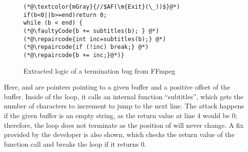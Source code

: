 \documentclass[acmsmall,screen,review,anonymous,nonacm]{acmart}
\begin{document}
\begin{wrapfigure}{R}{0.48\linewidth}
\begin{lstlisting}[xleftmargin=0.5em,name=FFmpeg,numbersep=6pt,basicstyle=\footnotesize\ttfamily]
(*@\textcolor{mGray}{//$AF(\m{Exit}(\_))$}@*)
if(b<0||b>=end)return 0;
while (b < end) {
(*@\faultyCode{b += subtitles(b); } @*)
(*@\repaircode{int inc=subtitles(b);} @*) 
(*@\repaircode{if (!inc) break;} @*) 
(*@\repaircode{b += inc;}@*)}
\end{lstlisting}
\begin{comment}
\begin{minipage}[b]{0.52\linewidth}
\begin{lstlisting}[name=FFmpeg,basicstyle=\footnotesize\ttfamily]
int ff_subtitles_next_line(char *ptr){
  int n = *; // strcspn(ptr,"\r\n");
  ptr += n; 
  if (*ptr == '\r') { 
     ptr++; 
     n++; }
  if (*ptr == '\n') n++;
  return n; }
\end{lstlisting}
%
\end{minipage}
\end{comment}
\caption{Extracted logic of a termination bug from FFmpeg} 
\label{fig:example:real_lefe_termination}
\end{wrapfigure}


Here,  and  are pointers pointing to a given buffer and a positive offset of the buffer. 
Inside of the loop, it calls an internal function ``{subtitles}'', which gets the number of characters to increment to jump to the next line. 
The attack happens if the given buffer is an empty string, as the return value at 
line 4 would be 0; therefore, the loop does not terminate as the position of  will never change. 
A fix provided by the developer is also shown, which checks the return value of the function call and breaks the loop if it returns 0. 
\end{document}
